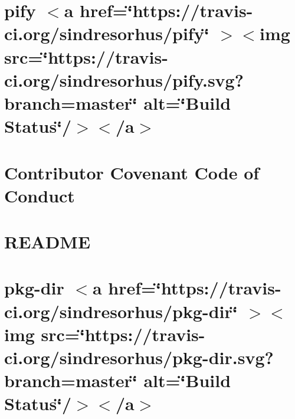 \documentclass[twoside]{book}
\newcommand{\+}{\discretionary{\mbox{\scriptsize$\hookleftarrow$}}{}{}}
\begin{document}
\chapter{pify \texorpdfstring{$<$}{<}a href=\char`\"{}https\+://travis-\/ci.\+org/sindresorhus/pify\char`\"{} \texorpdfstring{$>$}{>}\texorpdfstring{$<$}{<}img src=\char`\"{}https\+://travis-\/ci.\+org/sindresorhus/pify.\+svg?branch=master\char`\"{} alt=\char`\"{}\+Build Status\char`\"{}/\texorpdfstring{$>$}{>}\texorpdfstring{$<$}{<}/a\texorpdfstring{$>$}{>}}
\label{md__c___users_vaishnavi_jadhav__desktop__developer_code_mean_stack_example_client_node_modules_pify_readme}

\chapter{Contributor Covenant Code of Conduct}
\label{md__c___users_vaishnavi_jadhav__desktop__developer_code_mean_stack_example_client_node_modules_p48056f40bbf3d95c82707be6e34bea9a}

\chapter{README}
\label{md__c___users_vaishnavi_jadhav__desktop__developer_code_mean_stack_example_client_node_modules_piscina__r_e_a_d_m_e}

\chapter{pkg-\/dir \texorpdfstring{$<$}{<}a href=\char`\"{}https\+://travis-\/ci.\+org/sindresorhus/pkg-\/dir\char`\"{} \texorpdfstring{$>$}{>}\texorpdfstring{$<$}{<}img src=\char`\"{}https\+://travis-\/ci.\+org/sindresorhus/pkg-\/dir.\+svg?branch=master\char`\"{} alt=\char`\"{}\+Build Status\char`\"{}/\texorpdfstring{$>$}{>}\texorpdfstring{$<$}{<}/a\texorpdfstring{$>$}{>}}
\label{md__c___users_vaishnavi_jadhav__desktop__developer_code_mean_stack_example_client_node_modules_pkg_dir_readme}

\end{document}
